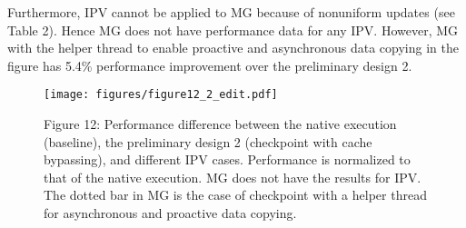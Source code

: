Furthermore, IPV cannot be applied to
MG because of nonuniform updates (see Table 2).
Hence MG does not have performance data for any IPV.
However, MG with the helper thread to enable proactive and asynchronous data copying in the figure has 5.4\% performance improvement over the preliminary design 2.

\begin{figure*}
\centering
\texttt{[image: figures/figure12\_2\_edit.pdf]}
\vspace{-20pt}
\caption*{Figure 12: Performance difference between the native execution (baseline), the preliminary design 2 (checkpoint with cache bypassing), and different IPV cases. Performance is normalized to that of the native execution. MG does not have the results for IPV. The dotted bar in MG is the case of checkpoint with a helper thread for asynchronous and proactive data copying.}
\label{fig:ipv_perf}
\vspace{-10pt}
\end{figure*}

\begin{comment}
\begin{figure*}
\centering
\texttt{[image: figures/E1\_2\_edit.pdf]}
\caption*{Figure x2:(1 BW) Performance difference between the native execution (baseline), the optimized preliminary design, and in-place versioning with cache flushing and without cache flushing.}
\label{fig:ipv_perf}
\end{figure*}
\end{comment}

\begin{comment}
\begin{figure}
\centering
\texttt{[image: figures/Dual\_clean.png]}
\caption*{Figure x: Performance difference between the original version and the in-place versioning. We use a heterogeneous NVM/DRAM system where NVM is configured with the same performance characteristics as DRAM.}
\label{fig:perf_diff_with_cache}
\end{figure}
\end{comment}

\begin{comment}
\begin{figure}
\centering
\texttt{[image: figures/Dual\_clean.png]}
\caption*{Figure x: Performance difference between the original version and the in-place versioning without cache flushing.}
\label{fig:perf_diff_no_cache}
\end{figure}
\end{comment}

